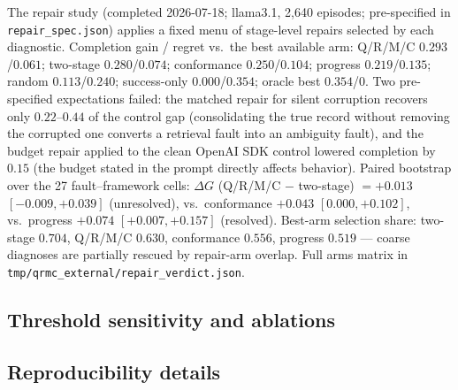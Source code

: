\documentclass[letterpaper]{article}
\begin{document}
The repair study (completed 2026-07-18; llama3.1, 2{,}640
episodes; pre-specified in \texttt{repair\_spec.json}) applies a
fixed menu of stage-level repairs selected by each diagnostic.
Completion gain / regret vs.\ the best available arm: Q/R/M/C
$0.293$/$0.061$; two-stage $0.280$/$0.074$; conformance
$0.250$/$0.104$; progress $0.219$/$0.135$; random $0.113$/$0.240$;
success-only $0.000$/$0.354$; oracle best $0.354$/$0$. Two
pre-specified expectations failed: the matched repair
for silent corruption recovers only $0.22$--$0.44$ of the control gap
(consolidating the true record without removing the corrupted one
converts a retrieval fault into an ambiguity fault), and the budget
repair applied to the clean OpenAI SDK control lowered completion by
$0.15$ (the budget stated in the prompt directly affects behavior).
Paired bootstrap over the 27 fault--framework cells:
$\Delta G$ (Q/R/M/C $-$ two-stage) $=+0.013$ $[-0.009,+0.039]$
(unresolved), vs.\ conformance $+0.043$ $[0.000,+0.102]$, vs.\
progress $+0.074$ $[+0.007,+0.157]$ (resolved). Best-arm selection
share: two-stage $0.704$, Q/R/M/C $0.630$, conformance $0.556$,
progress $0.519$ --- coarse diagnoses are partially rescued by
repair-arm overlap. Full arms matrix in
\texttt{tmp/qrmc\_external/repair\_verdict.json}.

\subsection{Threshold sensitivity and ablations}


\subsection{Reproducibility details}



\end{document}
